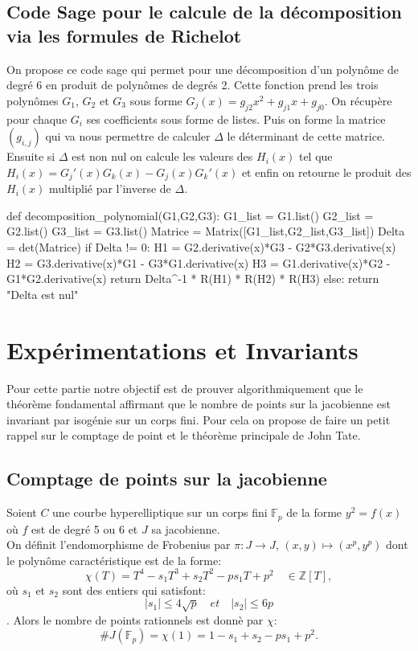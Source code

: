 \documentclass[12pt,a4paper]{article}
\begin{document}
	\subsection*{Code Sage pour le calcule de la décomposition via les formules de Richelot }
	On propose ce code sage qui permet pour une décomposition d'un polynôme de degré 6 en produit de polynômes de degrés 2. Cette fonction prend les trois polynômes $G_1$, $G_2$ et $G_3$ sous forme $G_j(x) = g_{j2}x^2 + g_{j1}x + g_{j0}$. On récupère pour chaque $G_i$ ses coefficients sous forme de listes. Puis on forme la matrice $(g_{i,j})$ qui va nous permettre de calculer $\Delta$ le déterminant de cette matrice. Ensuite si $\Delta$ est non nul on calcule les valeurs des $H_i(x)$ tel que $H_i(x) = G_j'(x)G_k(x) - G_j(x)G_k'(x)$ et enfin on retourne le produit des $H_i(x)$ multiplié par l'inverse de $\Delta$. 
	\begin{sageblock}
		def decomposition_polynomial(G1,G2,G3):
				G1_list = G1.list()
				G2_list = G2.list()
				G3_list = G3.list()
				Matrice = Matrix([G1_list,G2_list,G3_list])
				Delta = det(Matrice)
				if Delta != 0:
						H1 = G2.derivative(x)*G3 - G2*G3.derivative(x)
						H2 = G3.derivative(x)*G1 - G3*G1.derivative(x)
						H3 = G1.derivative(x)*G2 - G1*G2.derivative(x)
						return Delta^-1 * R(H1) * R(H2) * R(H3)
				else: return "Delta est nul"
	\end{sageblock}
	\newpage
	\section{Expérimentations et Invariants}
	Pour cette partie notre objectif est de prouver algorithmiquement que le théorème fondamental affirmant que le nombre de points sur la jacobienne est invariant par isogénie sur un corps fini. Pour cela on propose de faire un petit rappel sur le comptage de point et le théorème principale de John Tate.
	\subsection{Comptage de points sur la jacobienne}
	Soient $C$ une courbe hyperelliptique sur un corps fini $\mathbb{F}_p$ de la forme $y^2 = f(x)$ o\`u $f$ est de degré 5 ou 6 et $J$ sa jacobienne.\\
	On définit l'endomorphisme de Frobenius par $ \pi: J \to J$, $(x,y) \mapsto (x^p,y^p)$ dont le polynôme caractéristique est de la forme: \[
	\chi(T) = T^4 -s_1 T^3 + s_2 T^2 -ps_1T + p^2 \quad \in \mathbb{Z}[T], \]
	o\`u $s_1$ et $s_2$ sont des entiers qui satisfont: \[
	|s_1| \leq 4 \sqrt{p} \quad et \quad |s_2| \leq 6p\]. Alors le nombre de points rationnels est donn\`e par $\chi$: \[ \#J(\mathbb{F}_p) = \chi(1) = 1 -s_1 + s_2 -ps_1 + p^2.\]
	
\end{document}

